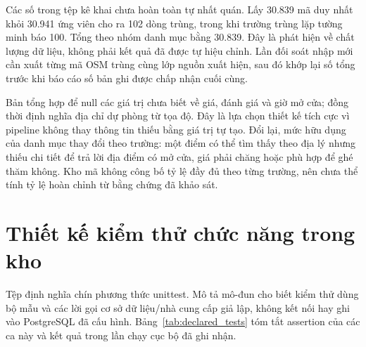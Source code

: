 Các số trong tệp kê khai chưa hoàn toàn tự nhất quán. Lấy 30.839 mã duy nhất khỏi 30.941 ứng viên cho ra 102 dòng trùng, trong khi trường trùng lặp tường minh báo 100. Tổng theo nhóm danh mục bằng 30.839. Đây là phát hiện về chất lượng dữ liệu, không phải kết quả đã được tự hiệu chỉnh. Lần đối soát nhập mới cần xuất từng mã OSM trùng cùng lớp nguồn xuất hiện, sau đó khớp lại số tổng trước khi báo cáo số bản ghi được chấp nhận cuối cùng.

Bản tổng hợp để null các giá trị chưa biết về giá, đánh giá và giờ mở cửa; đồng thời định nghĩa địa chỉ dự phòng từ tọa độ. Đây là lựa chọn thiết kế tích cực vì pipeline không thay thông tin thiếu bằng giá trị tự tạo. Đổi lại, mức hữu dụng của danh mục thay đổi theo trường: một điểm có thể tìm thấy theo địa lý nhưng thiếu chi tiết để trả lời địa điểm có mở cửa, giá phải chăng hoặc phù hợp để ghé thăm không. Kho mã không công bố tỷ lệ đầy đủ theo từng trường, nên chưa thể tính tỷ lệ hoàn chỉnh từ bằng chứng đã khảo sát.

\section{Thiết kế kiểm thử chức năng trong kho}

Tệp  định nghĩa chín phương thức unittest. Mô tả mô-đun cho biết kiểm thử dùng bộ mẫu và các lời gọi cơ sở dữ liệu/nhà cung cấp giả lập, không kết nối hay ghi vào PostgreSQL đã cấu hình. Bảng~\ref{tab:declared_tests} tóm tắt assertion của các ca này và kết quả trong lần chạy cục bộ đã ghi nhận.

